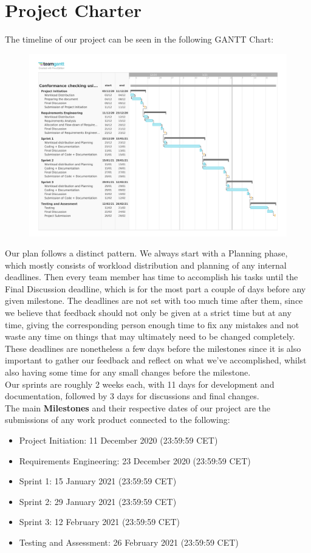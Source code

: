 \documentclass{article}
\begin{document}
\section{Project Charter}
The timeline of our project can be seen in the following GANTT Chart:

\begin{figure}[H]
\includegraphics[width = 12cm]{GANTT Chart.pdf}
\end{figure}

Our plan follows a distinct pattern. We always start with a Planning phase, which mostly consists of workload distribution and planning of any internal deadlines. Then every team member has time to accomplish his tasks until the Final Discussion deadline, which is for the most part a couple of days before any given milestone. The deadlines are not set with too much time after them, since we believe that feedback should not only be given at a strict time but at any time, giving the corresponding person enough time to fix any mistakes and not waste any time on things that may ultimately need to be changed completely. These deadlines are nonetheless a few days before the milestones since it is also important to gather our feedback and reflect on what we've accomplished, whilst also having some time for any small changes before the milestone.\\
Our sprints are roughly 2 weeks each, with 11 days for development and documentation, followed by 3 days for discussions and final changes.\\
The main \textbf{Milestones} and their respective dates of our project are the submissions of any work product connected to the following:
\begin{itemize}
    \item Project Initiation: 11 December 2020 (23:59:59 CET)
    \item Requirements Engineering: 23 December 2020 (23:59:59 CET)
    \item Sprint 1: 15 January 2021 (23:59:59 CET)
    \item Sprint 2: 29 January 2021 (23:59:59 CET)
    \item Sprint 3: 12 February 2021 (23:59:59 CET)
    \item Testing and Assessment: 26 February 2021 (23:59:59 CET)
\end{itemize}
\end{document}
